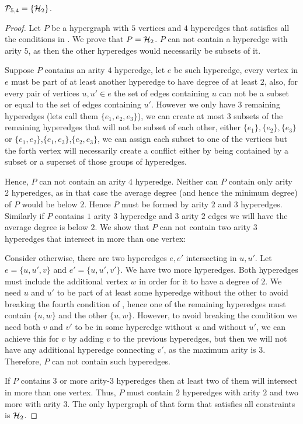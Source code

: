 \documentclass[a4paper,UKenglish,cleveref, autoref, numberwithinsect, thm-restate]{lipics-v2021}
\newcommand{\hypertwo}{\cH_2}
\newcommand{\cH}{{\cal H}}
\begin{document}
	\begin{claim}
		$\mathcal{P}_{5,4} = \{\hypertwo\}$.
	\end{claim}
	\begin{proof}
		Let $P$ be a hypergraph with $5$ vertices and $4$ hyperedges that satisfies all the conditions in . We prove that $P = \hypertwo$. $P$ can not contain a hyperedge with arity $5$, as then the other hyperedges would necessarily be subsets of it. 
		
		Suppose $P$ contains an arity $4$ hyperedge, let $e$ be such hyperedge, every vertex in $e$ must be part of at least another hyperedge to have degree of at least $2$, also, for every pair of vertices $u,u'\in e$ the set of edges containing $u$ can not be a subset or equal to the set of edges containing $u'$. However we only have $3$ remaining hyperedges (lets call them $\{e_1,e_2,e_3\}$), we can create at most $3$ subsets of the remaining hyperedges that will not be subset of each other, either $\{e_1\},\{e_2\},\{e_3\}$ or $\{e_1,e_2\}$,$\{e_1,e_3\}$,$\{e_2,e_3\}$, we can assign each subset to one of the vertices but the forth vertex will necessarily create a conflict either by being contained by a subset or a superset of those groups of hyperedges.
		
		Hence, $P$ can not contain an arity $4$ hyperedge. Neither can $P$ contain only arity $2$ hyperedges, as in that case the average degree (and hence the minimum degree) of $P$ would be below $2$. Hence $P$ must be formed by arity $2$ and $3$ hyperedges. Similarly if $P$ contains $1$ arity $3$ hyperedge and $3$ arity $2$ edges we will have the average degree is below $2$.
		We show that $P$ can not contain two arity $3$ hyperedges that intersect in more than one vertex:
		
		Consider otherwise, there are two hyperedges $e,e'$ intersecting in $u,u'$. Let $e = \{u,u',v\}$ and $e'=\{u,u',v'\}$. We have two more hyperedges. Both hyperedges must include the additional vertex $w$ in order for it to have a degree of $2$. We need $u$ and $u'$ to be part of at least some hyperedge without the other to avoid breaking the fourth condition of , hence one of the remaining hyperedges must contain $\{u,w\}$ and the other $\{u,w\}$. However, to avoid breaking the condition we need both $v$ and $v'$ to be in some hyperedge without $u$ and without $u'$, we can achieve this for $v$ by adding $v$ to the previous hyperedges, but then we will not have any additional hyperedge connecting $v'$, as the maximum arity is $3$. Therefore, $P$ can not contain such hyperedges.
		
		If $P$ contains $3$ or more arity-$3$ hyperedges then at least two of them will intersect in more than one vertex. Thus, $P$ must contain $2$ hyperedges with arity $2$ and two more with arity $3$. The only hypergraph of that form that satisfies all constraints is $\hypertwo$.
	\end{proof}
\end{document}
